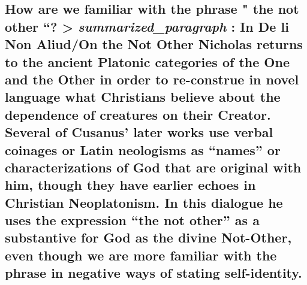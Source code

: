 \hypertarget{how-are-we-familiar-with-the-phrase-the-not-other-summarized_paragraph-in-de-li-non-aliudon-the-not-other-nicholas-returns-to-the-ancient-platonic-categories-of-the-one-and-the-other-in-order-to-re-construe-in-novel-language-what-christians-believe-about-the-dependence-of-creatures-on-their-creator.-several-of-cusanus-later-works-use-verbal-coinages-or-latin-neologisms-as-names-or-characterizations-of-god-that-are-original-with-him-though-they-have-earlier-echoes-in-christian-neoplatonism.-in-this-dialogue-he-uses-the-expression-the-not-other-as-a-substantive-for-god-as-the-divine-not-other-even-though-we-are-more-familiar-with-the-phrase-in-negative-ways-of-stating-self-identity.}{%
\subsection{\texorpdfstring{How are we familiar with the phrase " the
not other ``? \textgreater{} \emph{summarized\_paragraph} : In De li Non
Aliud/On the Not Other Nicholas returns to the ancient Platonic
categories of the One and the Other in order to re-construe in novel
language what Christians believe about the dependence of creatures on
their Creator. Several of Cusanus' later works use verbal coinages or
Latin neologisms as ``names'' or characterizations of God that are
original with him, though they have earlier echoes in Christian
Neoplatonism. \textbf{In this dialogue he uses the expression ``the not
other'' as a substantive for God as the divine Not-Other, even though we
are more familiar with the phrase in negative ways of stating
self-identity.}}{How are we familiar with the phrase " the not other ``? \textgreater{} summarized\_paragraph : In De li Non Aliud/On the Not Other Nicholas returns to the ancient Platonic categories of the One and the Other in order to re-construe in novel language what Christians believe about the dependence of creatures on their Creator. Several of Cusanus' later works use verbal coinages or Latin neologisms as ``names'' or characterizations of God that are original with him, though they have earlier echoes in Christian Neoplatonism. In this dialogue he uses the expression ``the not other'' as a substantive for God as the divine Not-Other, even though we are more familiar with the phrase in negative ways of stating self-identity.}}\label{how-are-we-familiar-with-the-phrase-the-not-other-summarized_paragraph-in-de-li-non-aliudon-the-not-other-nicholas-returns-to-the-ancient-platonic-categories-of-the-one-and-the-other-in-order-to-re-construe-in-novel-language-what-christians-believe-about-the-dependence-of-creatures-on-their-creator.-several-of-cusanus-later-works-use-verbal-coinages-or-latin-neologisms-as-names-or-characterizations-of-god-that-are-original-with-him-though-they-have-earlier-echoes-in-christian-neoplatonism.-in-this-dialogue-he-uses-the-expression-the-not-other-as-a-substantive-for-god-as-the-divine-not-other-even-though-we-are-more-familiar-with-the-phrase-in-negative-ways-of-stating-self-identity.}}

